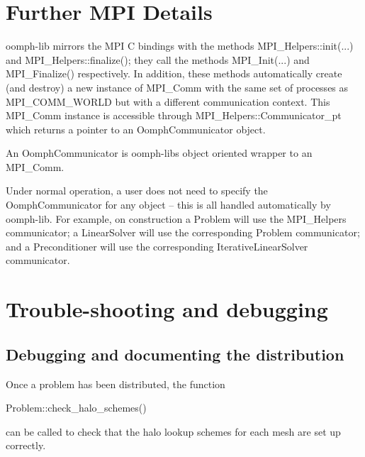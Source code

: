  

\hypertarget{index_mpidetails}{}\section{Further M\+P\+I Details}\label{index_mpidetails}

\begin{DoxyItemize}
\item {\ttfamily oomph-\/lib} mirrors the M\+PI C bindings with the methods {\ttfamily M\+P\+I\+\_\+\+Helpers\+::init}(...) and {\ttfamily M\+P\+I\+\_\+\+Helpers\+::finalize()}; they call the methods {\ttfamily M\+P\+I\+\_\+\+Init}(...) and {\ttfamily M\+P\+I\+\_\+\+Finalize()} respectively. In addition, these methods automatically create (and destroy) a new instance of {\ttfamily M\+P\+I\+\_\+\+Comm} with the same set of processes as {\ttfamily M\+P\+I\+\_\+\+C\+O\+M\+M\+\_\+\+W\+O\+R\+LD} but with a different communication context. This {\ttfamily M\+P\+I\+\_\+\+Comm} instance is accessible through {\ttfamily M\+P\+I\+\_\+\+Helpers\+::\+Communicator\+\_\+pt} which returns a pointer to an {\ttfamily Oomph\+Communicator} object.
\item An {\ttfamily Oomph\+Communicator} is {\ttfamily oomph-\/lib\textquotesingle{}s} object oriented wrapper to an {\ttfamily M\+P\+I\+\_\+\+Comm}.
\item Under normal operation, a user does not need to specify the {\ttfamily Oomph\+Communicator} for any object -- this is all handled automatically by {\ttfamily oomph-\/lib}. For example, on construction a {\ttfamily Problem} will use the {\ttfamily M\+P\+I\+\_\+\+Helpers} communicator; a {\ttfamily Linear\+Solver} will use the corresponding {\ttfamily Problem} communicator; and a {\ttfamily Preconditioner} will use the corresponding {\ttfamily Iterative\+Linear\+Solver} communicator.
\end{DoxyItemize}



 

\hypertarget{index_problem}{}\section{Trouble-\/shooting and debugging}\label{index_problem}
\hypertarget{index_checking_and_documenting}{}\subsection{Debugging and documenting the distribution}\label{index_checking_and_documenting}
Once a problem has been distributed, the function 
\begin{DoxyCode}
Problem::check\_halo\_schemes()
\end{DoxyCode}
 can be called to check that the halo lookup schemes for each mesh are set up correctly.

